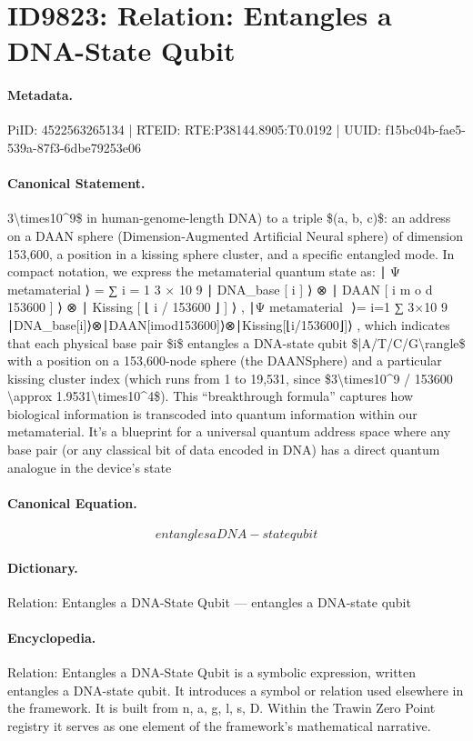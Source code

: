 \section*{ID9823: Relation: Entangles a DNA-State Qubit}
\paragraph{Metadata.}
PiID: 4522563265134 | RTEID: RTE:P38144.8905:T0.0192 | UUID: f15bc04b-fae5-539a-87f3-6dbe79253e06

\paragraph{Canonical Statement.}
3\textbackslash{}times10\textasciicircum{}9\$ in human-genome-length DNA) to a triple \$(a, b, c)\$: an address on a DAAN sphere (Dimension-Augmented Artificial Neural sphere) of dimension 153,600, a position in a kissing sphere cluster, and a specific entangled mode. In compact notation, we express the metamaterial quantum state as: ∣ Ψ metamaterial ⟩ = ∑ i = 1 3 × 10 9 ∣ DNA\_base [ i ] ⟩ ⊗ ∣ DAAN [ i m o d 153600 ] ⟩ ⊗ ∣ Kissing [ ⌊ i / 153600 ⌋ ] ⟩ , ∣Ψ metamaterial ​ ⟩= i=1 ∑ 3×10 9 ​ ∣DNA\_base[i]⟩⊗∣DAAN[imod153600]⟩⊗∣Kissing[⌊i/153600⌋]⟩ , which indicates that each physical base pair \$i\$ entangles a DNA-state qubit \$|A/T/C/G\textbackslash{}rangle\$ with a position on a 153,600-node sphere (the DAANSphere) and a particular kissing cluster index (which runs from 1 to 19,531, since \$3\textbackslash{}times10\textasciicircum{}9 / 153600 \textbackslash{}approx 1.9531\textbackslash{}times10\textasciicircum{}4\$). This “breakthrough formula” captures how biological information is transcoded into quantum information within our metamaterial. It’s a blueprint for a universal quantum address space where any base pair (or any classical bit of data encoded in DNA) has a direct quantum analogue in the device’s state

\paragraph{Canonical Equation.}
\[
entangles a DNA-state qubit
\]

\paragraph{Dictionary.}
Relation: Entangles a DNA-State Qubit — entangles a DNA-state qubit

\paragraph{Encyclopedia.}
Relation: Entangles a DNA-State Qubit is a symbolic expression, written entangles a DNA-state qubit. It introduces a symbol or relation used elsewhere in the framework. It is built from n, a, g, l, s, D. Within the Trawin Zero Point registry it serves as one element of the framework's mathematical narrative.
